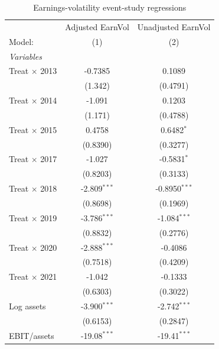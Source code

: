 \begin{table}[htbp]
   \caption{\label{tab:appendix_event_risk} Earnings-volatility event-study regressions}
   \centering
   \scriptsize
   \begin{tabular}{lcc}
      \tabularnewline \midrule \midrule
                              & Adjusted EarnVol & Unadjusted EarnVol \\
      Model:                  & (1)              & (2) \\
      \midrule
      \emph{Variables} \\
      Treat $\times$ 2013     & -0.7385          & 0.1089 \\
                              & (1.342)          & (0.4791) \\
      Treat $\times$ 2014     & -1.091           & 0.1203 \\
                              & (1.171)          & (0.4788) \\
      Treat $\times$ 2015     & 0.4758           & 0.6482$^{*}$ \\
                              & (0.8390)         & (0.3277) \\
      Treat $\times$ 2017     & -1.027           & -0.5831$^{*}$ \\
                              & (0.8203)         & (0.3133) \\
      Treat $\times$ 2018     & -2.809$^{***}$   & -0.8950$^{***}$ \\
                              & (0.8698)         & (0.1969) \\
      Treat $\times$ 2019     & -3.786$^{***}$   & -1.084$^{***}$ \\
                              & (0.8832)         & (0.2776) \\
      Treat $\times$ 2020     & -2.888$^{***}$   & -0.4086 \\
                              & (0.7518)         & (0.4209) \\
      Treat $\times$ 2021     & -1.042           & -0.1333 \\
                              & (0.6303)         & (0.3022) \\
      Log assets              & -3.900$^{***}$   & -2.742$^{***}$ \\
                              & (0.6153)         & (0.2847) \\
      EBIT/assets             & -19.08$^{***}$   & -19.41$^{***}$ \\

\end{tabular}
\end{table}
